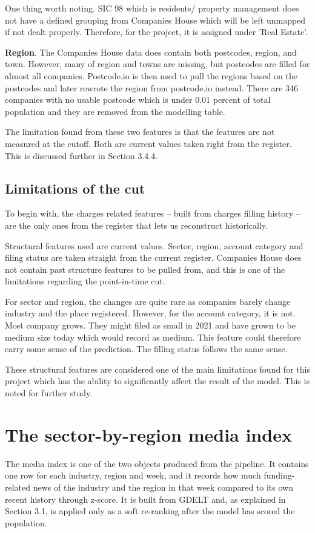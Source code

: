 \documentclass[ %
                    author={Natchalin Iwsakul \\[0.4em] Inkaphol Siriwongwattana \\[0.4em] Tanaphan Kummaraphat \\[0.6em] Patorn Srisupap},,
                supervisor={Fernando Moreno-Pino},
                    degree={MSc},
                     title={Propensity Modelling for SME Commercial Lending Using Open Public Data
},
                  subtitle={Companies House and GDELT as predictors of first-time borrowing},
                      type={},
                      year={2026}]{dissertation}
\begin{document}
  One thing worth noting. SIC 98 which is residents/ property management does not have a defined grouping from Companies House which will be left unmapped if not dealt properly. Therefore, for the project, it is assigned under 'Real Estate'.

  \textbf{Region}. The Companies House data does contain both postcodes, region, and town. However, many of region and towns are missing, but postcodes are filled for almost all companies. Postcode.io is then used to pull the regions based on the postcodes and later rewrote the region from postcode.io instead. There are 346 companies with no usable postcode which is under 0.01 percent of total population and they are removed from the modelling table.

  The limitation found from these two features is that the features are not measured at the cutoff. Both are current values taken right from the register. This is discussed further in Section 3.4.4.
  
  \subsection{Limitations of the cut}
  To begin with, the charges related features -- built from charges filling history -- are the only ones from the register that lets us reconstruct historically. 

  Structural features used are current values. Sector, region, account category and filing status are taken straight from the current register. Companies House does not contain past structure features to be pulled from, and this is one of the limitations regarding the point-in-time cut.

  For sector and region, the changes are quite rare as companies barely change industry and the place registered. However, for the account category, it is not. Most company grows. They might filed as small in 2021 and have grown to be medium size today which would record as medium. This feature could therefore carry some sense of the prediction. The filling status follows the same sense.

  These structural features are considered one of the main limitations found for this project which has the ability to significantly affect the result of the model. This is noted for further study.

\section{The sector-by-region media index}     \label{sec:mediaindex}
    The media index is one of the two objects produced from the pipeline. It contains one row for each industry, region and week, and it records how much funding-related news of the industry and the region in that week compared to its own recent history through z-score. It is built from GDELT and, as explained in Section 3.1, is applied only as a soft re-ranking after the model has scored the population.
\end{document}
